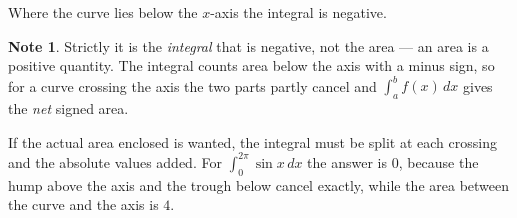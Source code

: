 \documentclass[11pt,a4paper]{article}
\theoremstyle{definition}
\newtheorem{note}[thm]{Note}
\begin{document}
\begin{figure}[H]
\centering
{}
\end{figure}













Where the curve lies below the $x$-axis the integral is negative.

\begin{note}
Strictly it is the \emph{integral} that is negative, not the area --- an area is a
positive quantity. The integral counts area below the axis with a minus sign, so
for a curve crossing the axis the two parts partly cancel and
$\int_{a}^{b}f(x)\,dx$ gives the \emph{net} signed area.

If the actual area enclosed is wanted, the integral must be split at each crossing
and the absolute values added. For $\int_{0}^{2\pi}\sin x\,dx$ the answer is $0$,
because the hump above the axis and the trough below cancel exactly, while the
area between the curve and the axis is $4$.
\end{note}
\end{document}
